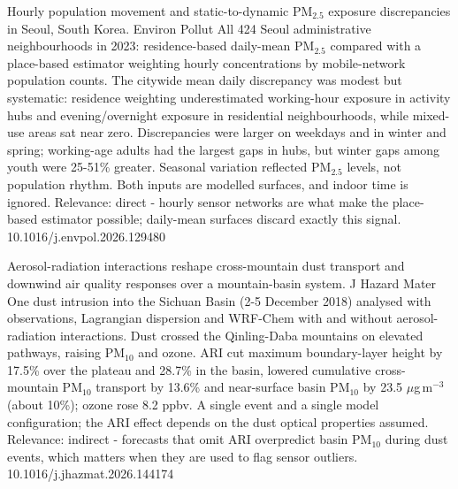 \documentclass[10pt]{article}
\begin{document}
{Hourly population movement and static-to-dynamic PM$_{2.5}$ exposure discrepancies in Seoul, South Korea.}
{Environ Pollut}
{All 424 Seoul administrative neighbourhoods in 2023: residence-based daily-mean PM$_{2.5}$ compared with a place-based estimator weighting hourly concentrations by mobile-network population counts. The citywide mean daily discrepancy was modest but systematic: residence weighting underestimated working-hour exposure in activity hubs and evening/overnight exposure in residential neighbourhoods, while mixed-use areas sat near zero. Discrepancies were larger on weekdays and in winter and spring; working-age adults had the largest gaps in hubs, but winter gaps among youth were 25-51\% greater. Seasonal variation reflected PM$_{2.5}$ levels, not population rhythm. Both inputs are modelled surfaces, and indoor time is ignored. Relevance: direct - hourly sensor networks are what make the place-based estimator possible; daily-mean surfaces discard exactly this signal.}
{10.1016/j.envpol.2026.129480}

{Aerosol-radiation interactions reshape cross-mountain dust transport and downwind air quality responses over a mountain-basin system.}
{J Hazard Mater}
{One dust intrusion into the Sichuan Basin (2-5 December 2018) analysed with observations, Lagrangian dispersion and WRF-Chem with and without aerosol-radiation interactions. Dust crossed the Qinling-Daba mountains on elevated pathways, raising PM$_{10}$ and ozone. ARI cut maximum boundary-layer height by 17.5\% over the plateau and 28.7\% in the basin, lowered cumulative cross-mountain PM$_{10}$ transport by 13.6\% and near-surface basin PM$_{10}$ by 23.5 $\mu$g\,m$^{-3}$ (about 10\%); ozone rose 8.2 ppbv. A single event and a single model configuration; the ARI effect depends on the dust optical properties assumed. Relevance: indirect - forecasts that omit ARI overpredict basin PM$_{10}$ during dust events, which matters when they are used to flag sensor outliers.}
{10.1016/j.jhazmat.2026.144174}
\end{document}
